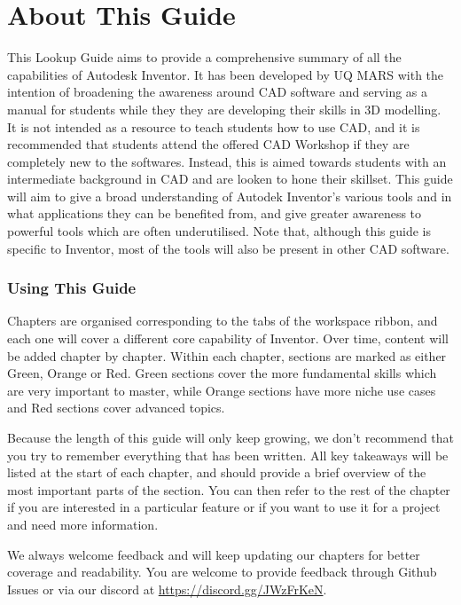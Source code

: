 \chapter{About This Guide}

This Lookup Guide aims to provide a comprehensive summary of all the capabilities of Autodesk Inventor. It has been developed by UQ MARS with the intention of broadening the awareness around CAD software and serving as a manual for students while they they are developing their skills in 3D modelling. It is not intended as a resource to teach students how to use CAD, and it is recommended that students attend the offered CAD Workshop if they are completely new to the softwares. Instead, this is aimed towards students with an intermediate background in CAD and are looken to hone their skillset. This guide will aim to give a broad understanding of Autodek Inventor's various tools and in what applications they can be benefited from, and give greater awareness to powerful tools which are often underutilised. Note that, although this guide is specific to Inventor, most of the tools will also be present in other CAD software.

\subsection{Using This Guide}
Chapters are organised corresponding to the tabs of the workspace ribbon, and each one will cover a different core capability of Inventor. Over time, content will be added chapter by chapter.
Within each chapter, sections are marked as either Green, Orange or Red. Green sections cover the more fundamental skills which are very important to master, while Orange sections have more niche use cases and Red sections cover advanced topics.

Because the length of this guide will only keep growing, we don't recommend that you try to remember everything that has been written. All key takeaways will be listed at the start of each chapter, and should provide a brief overview of the most important parts of the section. You can then refer to the rest of the chapter if you are interested in a particular feature or if you want to use it for a project and need more information.

We always welcome feedback and will keep updating our chapters for better coverage and readability. You are welcome to provide feedback through Github Issues or via our discord at \url{https://discord.gg/JWzFrKeN}.
